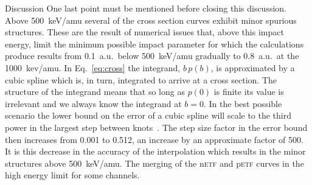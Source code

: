 \documentclass[aps, pra, reprint, groupedaddress, amsfonts,
               amsmath, amssymb, showpacs, nofootinbib]{revtex4-1}
\begin{document}
\begin{section}{Discussion \label{sec:disc}}
   One last point must be mentioned before closing this discussion. Above 500~keV/amu several of the
   cross section curves exhibit minor spurious structures. These are the result of numerical issues
   that, above this impact energy, limit the minimum possible impact parameter for which the
   calculations produce results from 0.1~a.u.\ below 500~keV/amu gradually to 0.8~a.u.\ at the
   1000~kev/amu. In Eq.~\eqref{eq:cross} the integrand, $b \, p(b)$, is approximated by a cubic spline
   which is, in turn, integrated to arrive at a cross section. The structure of the integrand means that
   so long as $p(0)$ is finite its value is irrelevant and we always know the integrand at $b = 0$. In
   the best possible scenario the lower bound on the error of a cubic spline will scale to the third
   power in the largest step between knots~\cite{spline-err}. The step size factor in the error bound
   then increases from 0.001 to 0.512, an increase by an approximate factor of 500. It is this decrease
   in the accuracy of the interpolation which results in the minor structures above 500~keV/amu.
   The merging of the n\textsc{etf} and p\textsc{etf} curves in the high energy limit for some channels.

\end{section}
\end{document}

